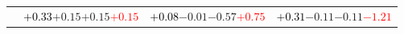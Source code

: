 \documentclass[compress]{beamer}
\begin{document}
\begin{frame}
\begin{tabular}{r | c | c | c}
          & \textcolor{black}{$+0.33$}\hspace{0.1 cm}$+0.15$\hspace{0.1 cm}$+0.15$\hspace{0.1 cm}\textcolor{red}{$+0.15$} & \textcolor{black}{$+0.08$}\hspace{0.1 cm}$-0.01$\hspace{0.1 cm}$-0.57$\hspace{0.1 cm}\textcolor{red}{$+0.75$} & \textcolor{black}{$+0.31$}\hspace{0.1 cm}$-0.11$\hspace{0.1 cm}$-0.11$\hspace{0.1 cm}\textcolor{red}{$-1.21$} \\
\end{tabular}
\end{frame}
\end{document}

